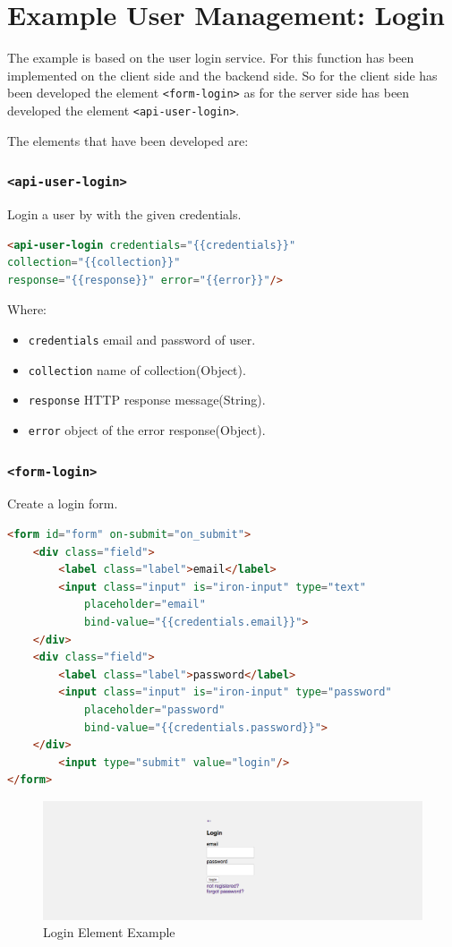 \section{Example User Management: Login}
\label{sec:XPR_exmpl}

The example is based on the user login service. 
For this function has been implemented on the client side and the backend side. So for the client side has been developed the element \texttt{<form-login>} as for the server side has been developed the element \texttt{<api-user-login>}.

The elements that have been developed are:

\subsubsection{\texttt{<api-user-login>}}

Login a user by with the given credentials.

\begin{lstlisting}[language=html]
<api-user-login credentials="{{credentials}}"
collection="{{collection}}" 
response="{{response}}" error="{{error}}"/>
\end{lstlisting}
Where:
\begin{itemize}
\item \texttt{credentials} email and password of user.
\item \texttt{collection} name of collection(Object).
\item \texttt{response}	HTTP response message(String).
\item \texttt{error} object of the error response(Object).
\end{itemize}

\subsubsection{\texttt{<form-login>}}

Create a login form.

\begin{lstlisting}[language=html]
<form id="form" on-submit="on_submit">
    <div class="field">
        <label class="label">email</label>
        <input class="input" is="iron-input" type="text" 
    		placeholder="email" 
            bind-value="{{credentials.email}}">
    </div>
    <div class="field">
        <label class="label">password</label>
        <input class="input" is="iron-input" type="password" 
        	placeholder="password" 
        	bind-value="{{credentials.password}}">
    </div>
      	<input type="submit" value="login"/>
</form>
\end{lstlisting}


\begin {figure}[h]
\graphicspath{{images/chapter_USR/}}
\includegraphics[width=\textwidth]{usr1}
\caption{Login Element Example}
\end {figure}